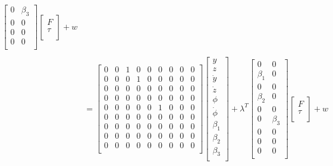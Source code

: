 \documentclass[12pt]{article}
\begin{document}
\begin{align*}
\begin{bmatrix}
        0 & \beta_3 \\
        0 & 0 \\
        0 & 0 \\
        0 & 0 \\
    \end{bmatrix}
    \begin{bmatrix}
        F \\
        \tau \\
    \end{bmatrix} + w\\ \\
    &= 
    \begin{bmatrix}
        0 & 0 & 1 & 0 & 0 & 0 & 0 & 0 & 0 \\
        0 & 0 & 0 & 1 & 0 & 0 & 0 & 0 & 0 \\
        0 & 0 & 0 & 0 & 0 & 0 & 0 & 0 & 0 \\
        0 & 0 & 0 & 0 & 0 & 0 & 0 & 0 & 0 \\
        0 & 0 & 0 & 0 & 0 & 1 & 0 & 0 & 0 \\
        0 & 0 & 0 & 0 & 0 & 0 & 0 & 0 & 0 \\
        0 & 0 & 0 & 0 & 0 & 0 & 0 & 0 & 0 \\
        0 & 0 & 0 & 0 & 0 & 0 & 0 & 0 & 0 \\
        0 & 0 & 0 & 0 & 0 & 0 & 0 & 0 & 0 \\
    \end{bmatrix}
    \begin{bmatrix}
        y \\
        z \\
        \dot{y} \\
        \dot{z} \\
        \phi \\
        \dot{\phi} \\
        \beta_1 \\
        \beta_2 \\
        \beta_3 \\
    \end{bmatrix} +
    \lambda^T 
    \begin{bmatrix}
        0 & 0 \\
        \beta_1 & 0 \\
        0 & 0 \\
        \beta_2 & 0 \\
        0 & 0 \\
        0 & \beta_3 \\
        0 & 0 \\
        0 & 0 \\
        0 & 0 \\
    \end{bmatrix}
    \begin{bmatrix}
        F \\
        \tau \\
    \end{bmatrix} + w\\
\end{align*}
\end{document}
